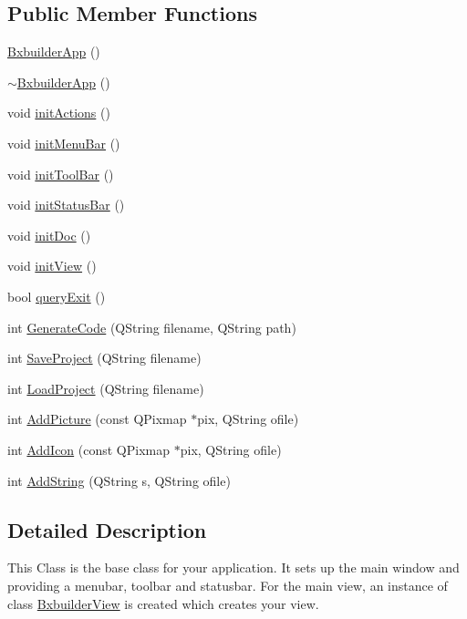 \subsection*{Public Member Functions}
\begin{CompactItemize}
\item 
\hyperlink{class_bxbuilder_app_d965542ad52df92ac3436d51d5779e64}{BxbuilderApp} ()
\item 
\hyperlink{class_bxbuilder_app_70adc92630903b6de478681512c81587}{$\sim$BxbuilderApp} ()
\item 
void \hyperlink{class_bxbuilder_app_3add754bdd339f64be1dff4546be65f5}{initActions} ()
\item 
void \hyperlink{class_bxbuilder_app_0b0e9cd41d19d9cb52443c381a519994}{initMenuBar} ()
\item 
void \hyperlink{class_bxbuilder_app_d5414532a5173cf4300aa970df739927}{initToolBar} ()
\item 
void \hyperlink{class_bxbuilder_app_c3e521a0308f0922cc977d844a70446d}{initStatusBar} ()
\item 
void \hyperlink{class_bxbuilder_app_1b46eee64082444023546bcbda536ef3}{initDoc} ()
\item 
void \hyperlink{class_bxbuilder_app_afcf982312922a03e9bb1f072c10b3ca}{initView} ()
\item 
bool \hyperlink{class_bxbuilder_app_ebc4099d6b19d2cf5e1426f347023e85}{queryExit} ()
\item 
int \hyperlink{class_bxbuilder_app_9a81d6d109d6390aa3e68b61be86aeb0}{GenerateCode} (QString filename, QString path)
\item 
int \hyperlink{class_bxbuilder_app_d1ce6732a3a8cf0b96c172e8992529b1}{SaveProject} (QString filename)
\item 
int \hyperlink{class_bxbuilder_app_321d70a96fbd3ed6bfd87e78e9a67e3a}{LoadProject} (QString filename)
\item 
int \hyperlink{class_bxbuilder_app_1ee74b295c93cc6a2a07cc1a5a0d1c7b}{AddPicture} (const QPixmap $\ast$pix, QString ofile)
\item 
int \hyperlink{class_bxbuilder_app_fb78e67f867e469d371276546899c62f}{AddIcon} (const QPixmap $\ast$pix, QString ofile)
\item 
int \hyperlink{class_bxbuilder_app_2ba78d3f4aa8b7447c6dfe33e290cf17}{AddString} (QString s, QString ofile)
\end{CompactItemize}


\subsection{Detailed Description}
This Class is the base class for your application. It sets up the main window and providing a menubar, toolbar and statusbar. For the main view, an instance of class \hyperlink{class_bxbuilder_view}{BxbuilderView} is created which creates your view. 

